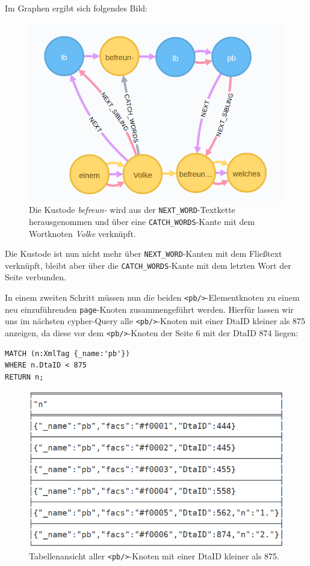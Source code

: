 Im Graphen ergibt sich folgendes Bild:

\begin{figure}
\centering
\includegraphics{Bilder/TEI2Graph/fw-catch-words.png}
\caption{Die Kustode \emph{befreun-} wird aus der
\texttt{NEXT\_WORD}-Textkette herausgenommen und über eine
\texttt{CATCH\_WORDS}-Kante mit dem Wortknoten \emph{Volke} verknüpft.}
\end{figure}

Die Kustode ist nun nicht mehr über \texttt{NEXT\_WORD}-Kanten mit dem
Fließtext verknüpft, bleibt aber über die \texttt{CATCH\_WORDS}-Kante
mit dem letzten Wort der Seite verbunden.

In einem zweiten Schritt müssen nun die beiden
\texttt{\textless{}pb/\textgreater{}}-Elementknoten zu einem neu
einzuführenden \texttt{page}-Knoten zusammengeführt werden. Hierfür
lassen wir uns im nächsten cypher-Query alle
\texttt{\textless{}pb/\textgreater{}}-Knoten mit einer DtaID kleiner als
875 anzeigen, da diese vor dem
\texttt{\textless{}pb/\textgreater{}}-Knoten der Seite 6 mit der DtaID
874 liegen:

\begin{verbatim}
MATCH (n:XmlTag {_name:'pb'})
WHERE n.DtaID < 875
RETURN n;
\end{verbatim}

\begin{figure}
\centering
\includegraphics{Bilder/TEI2Graph/pb-Element-Tabelle.png}
\caption{Tabellenansicht aller
\texttt{\textless{}pb/\textgreater{}}-Knoten mit einer DtaID kleiner als
875.}
\end{figure}

